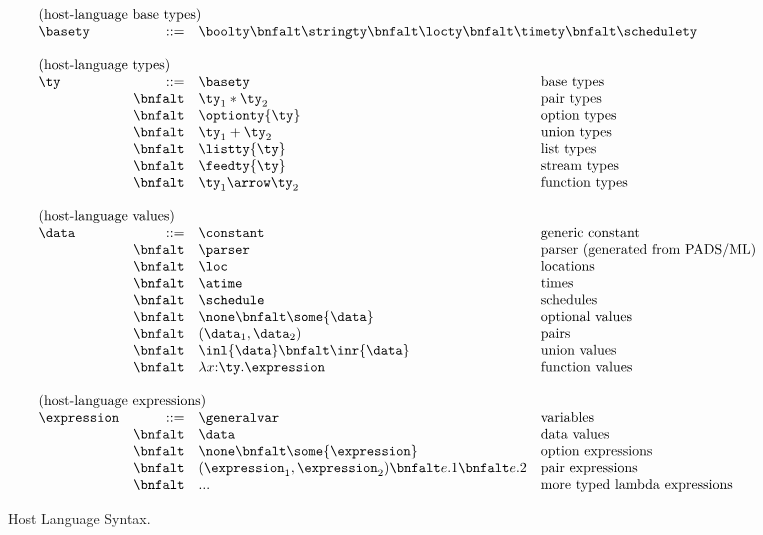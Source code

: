 \begin{figure*}[t]
\[
\begin{array}{lrll}
\multicolumn{4}{l}{\mbox{(host-language base types)}}\\ 
\basety & ::= & \multicolumn{2}{l}{\boolty \bnfalt \stringty \bnfalt \locty \bnfalt \timety \bnfalt \schedulety} \\
\\
\multicolumn{4}{l}{\mbox{(host-language types)}}\\ 
\ty & ::= & \basety & \mbox{base types} \\
 & \bnfalt & \ty_1 * \ty_2 & \mbox{pair types} \\
 & \bnfalt & \optionty{\ty} & \mbox{option types}\\
 & \bnfalt & \ty_1 + \ty_2 & \mbox{union types} \\
 & \bnfalt & \listty{\ty} & \mbox{list types}\\
 & \bnfalt & \feedty{\ty} & \mbox{stream types}\\
 & \bnfalt & \ty_1 \arrow \ty_2 & \mbox{function types} \\
\\
\multicolumn{4}{l}{\mbox{(host-language values)}}\\ 
\data & ::=     & \constant & \mbox{generic constant} \\
 & \bnfalt & \parser & \mbox{parser (generated from PADS/ML)} \\
 & \bnfalt & \loc & \mbox{locations} \\
 & \bnfalt & \atime & \mbox{times} \\
 & \bnfalt & \schedule & \mbox{schedules} \\
 & \bnfalt & \none \bnfalt 
                           \some{\data} & \mbox{optional values}\\
 & \bnfalt & (\data_1,\data_2) & \mbox{pairs} \\
 & \bnfalt & \inl{\data} \bnfalt 
                           \inr{\data} & \mbox{union values} \\
& \bnfalt & \lambda x{:}\ty.\expression & \mbox{function values} \\
\\
\multicolumn{4}{l}{\mbox{(host-language expressions)}}\\ 
\expression & ::= & \generalvar & \mbox{variables} \\
 & \bnfalt & \data & \mbox{data values} \\
 & \bnfalt & \none \bnfalt 
              \some{\expression} & \mbox{option expressions}\\
 & \bnfalt & (\expression_1,\expression_2) \bnfalt e.1 \bnfalt e.2 
    & \mbox{pair expressions} \\
 & \bnfalt & ... & \mbox{more typed lambda expressions} \\
\end{array}
\]
\caption{Host Language Syntax.}
\label{fig:host-language}
\end{figure*}


